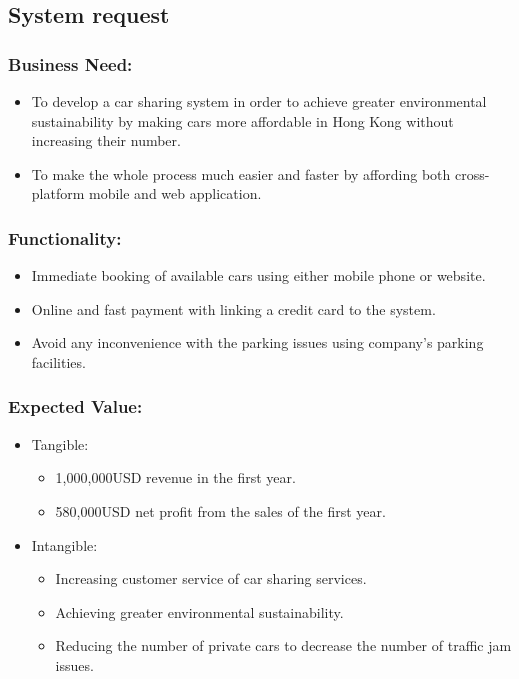 \documentclass{article}
\begin{document}
    \subsection{System request}
        \subsubsection{Business Need:}
        \begin{itemize}
            \item To develop a car sharing system in order to achieve greater environmental sustainability by making cars more affordable in Hong Kong without increasing their number.
            \item To make the whole process much easier and faster by affording both cross-platform mobile and web application.
        \end{itemize}
        
        \subsubsection{Functionality:}
        \begin{itemize}
            \item Immediate booking of available cars using either mobile phone or website.
            \item Online and fast payment with linking a credit card to the system.
            \item Avoid any inconvenience with the parking issues using company’s parking facilities.
        \end{itemize}
        
        \subsubsection{Expected Value:}
        \begin{itemize}
            \item Tangible:
                \begin{itemize}
                    \item 1,000,000USD revenue in the first year.
                    \item 580,000USD net profit from the sales of the first year.
                \end{itemize}
            \item Intangible:
                \begin{itemize}
                    \item Increasing customer service of car sharing services.
                    \item Achieving greater environmental sustainability.
                    \item Reducing the number of private cars to decrease the number of traffic jam issues.
                \end{itemize}
        \end{itemize}
        
\end{document}
